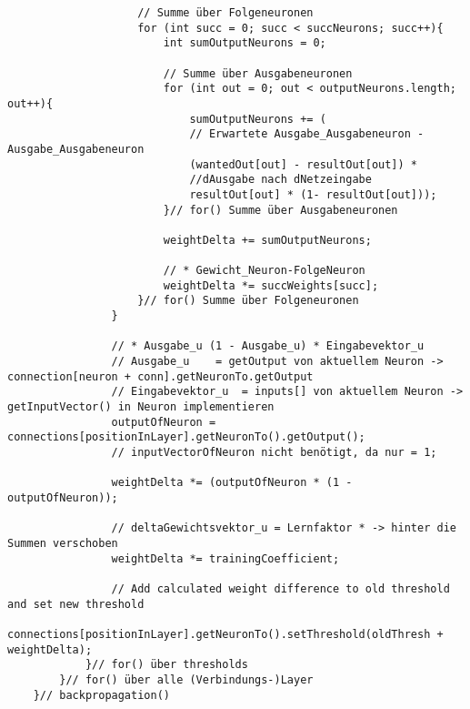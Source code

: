\begin{lstlisting}
					// Summe über Folgeneuronen
					for (int succ = 0; succ < succNeurons; succ++){
						int sumOutputNeurons = 0;
						
						// Summe über Ausgabeneuronen
						for (int out = 0; out < outputNeurons.length; out++){
							sumOutputNeurons += (
							// Erwartete Ausgabe_Ausgabeneuron - Ausgabe_Ausgabeneuron
							(wantedOut[out] - resultOut[out]) *
							//dAusgabe nach dNetzeingabe
							resultOut[out] * (1- resultOut[out]));
						}// for() Summe über Ausgabeneuronen
				
						weightDelta += sumOutputNeurons;
						
						// * Gewicht_Neuron-FolgeNeuron
						weightDelta *= succWeights[succ];
					}// for() Summe über Folgeneuronen
				}
				
				// * Ausgabe_u (1 - Ausgabe_u) * Eingabevektor_u
				// Ausgabe_u	= getOutput von aktuellem Neuron -> connection[neuron + conn].getNeuronTo.getOutput
				// Eingabevektor_u	= inputs[] von aktuellem Neuron -> getInputVector() in Neuron implementieren				
				outputOfNeuron = connections[positionInLayer].getNeuronTo().getOutput();
				// inputVectorOfNeuron nicht benötigt, da nur = 1;
					
				weightDelta *= (outputOfNeuron * (1 - outputOfNeuron));
					
				// deltaGewichtsvektor_u = Lernfaktor * -> hinter die Summen verschoben
				weightDelta *= trainingCoefficient;
					
				// Add calculated weight difference to old threshold and set new threshold
				connections[positionInLayer].getNeuronTo().setThreshold(oldThresh + weightDelta);
			}// for() über thresholds
		}// for() über alle (Verbindungs-)Layer
	}// backpropagation()
\end{lstlisting}